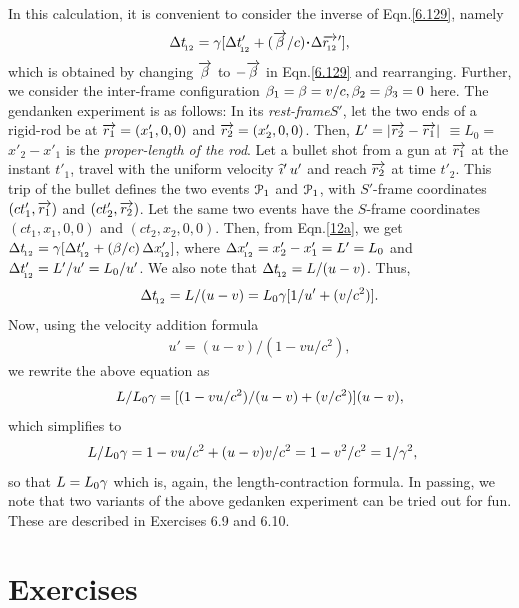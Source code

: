 In this calculation, it is convenient to consider the 
inverse of Eqn.\eqref{6.129}, namely
\begin{align}\label{12a}
\Delta t_\sfx{12} =\gkg[\Delta
t'_\sfx{12}+(\veca{\gkb}/c)\dotp\Delta
\pvec{r_\sfx{12}}],
\end{align}
which is obtained by changing  $\overrightarrow{{\beta}}$ to $ 
-\overrightarrow{{\beta}}$ in Eqn.\eqref{6.129} and rearranging. 
Further, we consider the inter-frame configuration 
${\beta}_1 = {\beta} = v/c,{\beta}_2 = {\beta}_3=0$ here. The 
gendanken experiment is as follows: In its 
\textsl{rest-frame}$S'$, let the two ends of a 
rigid-rod be at $\overrightarrow{r_1}=(x'_1,0,0) $ and  
$\overrightarrow{r_2}=(x'_2,0,0) $. Then, 
$L'=|\overrightarrow{r_2}-\overrightarrow{r_1}|$ $\equiv L_0=$ $x'_2-x'_1$ is 
the 
\textsl{proper-length of the rod}. Let a bullet shot 
from a gun at $\overrightarrow{r_1}$ at the instant $t'_1$, 
travel 
with the uniform velocity ${\widehat{\imath}}'\,u' $ and reach  
$\overrightarrow{r_2}$ at time $t'_2$. This trip of the bullet 
defines the two events $\EuScript{P}_1$ and  
$\EuScript{P}_1$, with $S'$-frame coordinates $ 
(ct'_1,\overrightarrow{r_1})$ and $(ct'_2,\overrightarrow{r_2})$. Let the 
same two events have the $S$-frame coordinates 
$(ct_1,x_1,0,0)$ and $ (ct_2,x_2,0,0) $. Then, from 
Eqn.\eqref{12a}, we get $\Delta t_{_{\hspace*{-1.5pt}{12}}}={\gamma}[\Delta 
t'_{_{\hspace*{-1.5pt}{12}}}+({\beta}/c)\,\Delta x'_{_{\hspace*{-1.5pt}{12}}}]$,  where 
$\Delta x'_{_{\hspace*{-1.5pt}{12}}}=x'_2-x'_1 = L'=L_0$ and $\Delta 
t'_{_{\hspace*{-1.5pt}{12}}} =L'/u' =L_0/u' $. We also note that  
$\Delta t_{_{\hspace*{-1.5pt}{12}}}= L/(u-v)$. Thus, 
\begin{align}\label{14}
\Delta t_{_{\hspace*{-1.5pt}{12}}}=L/(u-v)=L_0{\gamma}[1/u'+(v/c^2)].
\end{align}
Now, using the velocity addition formula 
\begin{align*}
 u'=(u-v)/(1-vu/c^2),
\end{align*}
we rewrite the above equation as 
\begin{align*}
L/L_0{\gamma}=[(1-vu/c^2)/(u-v) 
+(v/c^2)](u-v),
\end{align*}
which simplifies to 
\begin{align*} 
L/L_0{\gamma} &= 1-vu/c^2 +
(u-v)v/c^2=1-v^2/c^2  = 1/{\gamma}^2,              
\end{align*}
so that $L=L_0{\gamma}$ which is, again, the 
length-contraction 
formula. In passing, we note that two variants of the 
above 
gedanken experiment can be tried out for fun. These 
are described in Exercises 6.9 and 6.10. 

\section*{Exercises}

